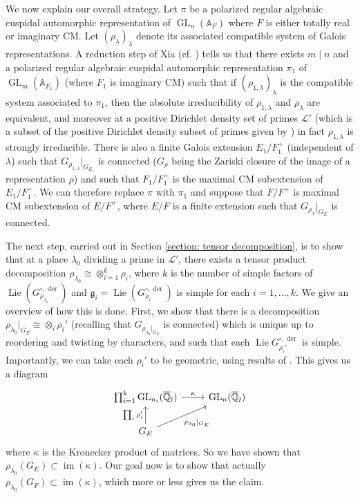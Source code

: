 \documentclass{amsart}
\theoremstyle{definition}
\numberwithin{equation}{section} %
\newcommand{\GL}{\operatorname{GL}}
\newcommand{\Lie}{\operatorname{Lie}}
\newcommand{\im}{\operatorname{im}}
\newcommand{\der}{\operatorname{der}}
\newcommand{\bb}[1]{\mathbb{#1}}
\newcommand{\mc}[1]{\mathcal{#1}}
\newcommand{\mf}[1]{\mathfrak{#1}}
\newcommand{\ol}[1]{\overline{#1}}
\begin{document}
We now explain our overall strategy. Let \( \pi \) be a polarized regular algebraic cuspidal automorphic representation of \( \GL_n(\bb{A}_F) \) where \( F \) is either totally real or imaginary CM. Let \( (\rho_\lambda)_\lambda \) denote its associated compatible system of Galois representations. A reduction step of Xia (cf. ) tells us that there exists \( m\mid n \) and a polarized regular algebraic cuspidal automorphic representation \( \pi_1 \) of \( \GL_m(\bb{A}_{F_1}) \) (where \( F_1 \) is imaginary CM) such that if \( (\rho_{1,\lambda})_\lambda \) is the compatible system associated to \( \pi_1 \), then the absolute irreducibility of \( \rho_{1,\lambda} \) and \( \rho_\lambda \) are equivalent, and moreover at a positive Dirichlet density set of primes \( \mc{L}' \) (which is a subset of the positive Dirichlet density subset of primes given by \cite{PatTay15}) in fact \( \rho_{1,\lambda} \) is strongly irreducible. There is also a finite Galois extension \( E_1/F_1^+ \) (independent of \( \lambda \)) such that \( G_{\rho_{1,\lambda}}|_{G_{E_1}} \) is connected (\( G_{\rho} \) being the Zariski closure of the image of a representation \( \rho \)) and such that \( F_1/F_1^+ \) is the maximal CM subextension of \( E_1/F_1^+ \). We can therefore replace \( \pi \) with \( \pi_1 \) and
suppose that \( F/F^+ \) is maximal CM subextension of \( E/F^+ \), where \( E/F \) is a finite extension such that \( G_{\rho_\lambda}|_{G_E} \) is connected.

The next step, carried out in Section \ref{section: tensor decomposition}, is to show that at a place \( \lambda_0 \) dividing a prime in \( \mc{L}' \), there exists a tensor product decomposition \( \rho_{\lambda_0}\cong\otimes_{i=1}^k \rho_i \), where \( k \) is the number of simple factors of \( \Lie(G_{\rho_{\lambda_0}}^{\circ,\der}) \) and \( \mf{g}_i=\Lie(G_{\rho_i}^{\circ,\der}) \) is simple for each \( i=1,\dots,k \). We give an overview of how this is done. First, we show that there is a decomposition \( \rho_{\lambda_0}|_{G_{E}} \cong \otimes_i \rho_i' \) (recalling that \( G_{\rho_{\lambda_0}|_{G_E}} \) is connected) which is unique up to reordering and twisting by characters, and such that each \( \Lie G_{\rho_i'}^{\circ,\der} \) is simple. 
Importantly, we can take each $\rho_i'$ to be geometric, using results of \cite{patrikis2019variations}.
This gives us a diagram
\[ \begin{tikzcd}
    \prod_{i=1}^k \GL_{n_i}(\ol{\bb{Q}}_l)\ar{r}{\kappa} & \GL_n(\ol{\bb{Q}}_l) \\
    G_E\ar{u}{\prod_i\rho_i'}\ar[swap]{ru}{\rho_{\lambda_0}|_{G_E}} &
\end{tikzcd}
\]
where \( \kappa \) is the Kronecker product of matrices. So we have shown that \( \rho_{\lambda_0}(G_E) \subset \im(\kappa) \). Our goal now is to show that actually \( \rho_{\lambda_0}(G_F)\subset \im(\kappa) \), which more or less gives us the claim.
\end{document}
